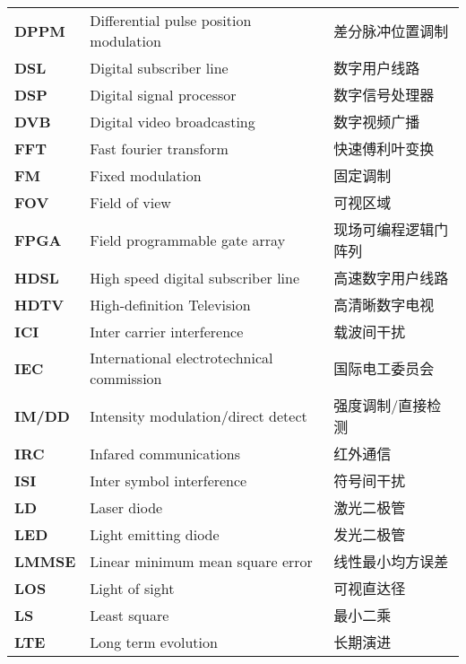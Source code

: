 \begin{terminology}
\begin{longtable}{lll}
        \bf{DPPM}        &	Differential pulse position modulation    &	差分脉冲位置调制	\\
        \bf{DSL}         &	Digital subscriber line                   &	数字用户线路	\\
        \bf{DSP}         &	Digital signal processor                  &	数字信号处理器	\\
        \bf{DVB}         &	Digital video broadcasting                &	数字视频广播	\\
        \bf{FFT}         &	Fast fourier transform                    &	快速傅利叶变换	\\
        \bf{FM}          &	Fixed modulation                          &	固定调制	\\
        \bf{FOV}         &	Field of view                             &	可视区域	\\
        \bf{FPGA}        &	Field programmable gate array             &	现场可编程逻辑门阵列	\\
        \bf{HDSL}        &	High speed digital subscriber line        &	高速数字用户线路	\\
        \bf{HDTV}        &	High-definition Television                &	高清晰数字电视	\\
        \bf{ICI}         &	Inter carrier interference                &	载波间干扰	\\
        \bf{IEC}         &	International electrotechnical commission &	国际电工委员会	\\
        \bf{IM/DD}       &	Intensity modulation/direct detect        &	强度调制/直接检测	\\
        \bf{IRC}	     &	Infared communications                    &	红外通信	\\
        \bf{ISI}	     &	Inter symbol interference                 &	符号间干扰	\\
        \bf{LD}          &	Laser diode                               &	激光二极管	\\
        \bf{LED}	     &	Light emitting diode                      &	发光二极管	\\
        \bf{LMMSE}       &	Linear minimum mean square error          &	线性最小均方误差	\\
        \bf{LOS}         &	Light of sight                            &	可视直达径	\\
        \bf{LS}          &	Least square                              &	最小二乘	\\
        \bf{LTE}         &	Long term evolution                       &	长期演进	\\

\end{longtable}
\end{terminology}
